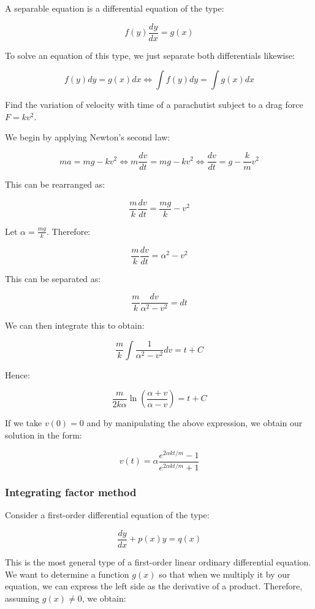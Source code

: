 \documentclass[12pt]{article}
\begin{document}
A separable equation is a differential equation of the type:

\[ f(y)\frac{dy}{dx} = g(x) \]

To solve an equation of this type, we just separate both differentials likewise:

\[ f(y)dy = g(x)dx \Leftrightarrow \int f(y)dy = \int g(x)dx \]

\begin{example}
    Find the variation of velocity with time of a parachutist subject to a drag force $F = kv^2$.

    We begin by applying Newton's second law:

    \[ ma = mg - kv^2 \Leftrightarrow m\frac{dv}{dt} = mg - kv^2 \Leftrightarrow \frac{dv}{dt} = g - \frac{k}{m}v^2\]

    This can be rearranged as:

    \[ \frac{m}{k}\frac{dv}{dt} = \frac{mg}{k} - v^2 \]

    Let $\alpha = \frac{mg}{k}$. Therefore:

    \[ \frac{m}{k}\frac{dv}{dt} = \alpha^2 - v^2 \]

    This can be separated as:

    \[ \frac{m}{k}\frac{dv}{\alpha^2 - v^2} = dt \]

    We can then integrate this to obtain:

    \[ \frac{m}{k}\int\frac{1}{\alpha^2 - v^2}dv = t + C\]

    Hence:

    \[ \frac{m}{2k\alpha}\ln{\left(\frac{\alpha + v}{\alpha - v}\right)} = t + C \]

    If we take $v(0) = 0$ and by manipulating the above expression, we obtain our solution in the form:

    \[ v(t) = \alpha \frac{e^{2\alpha kt/m} - 1}{e^{2\alpha kt/m} + 1} \]
\end{example}

\subsubsection{Integrating factor method}

Consider a first-order differential equation of the type:

\[ \frac{dy}{dx} + p(x)y = q(x) \]

This is the most general type of a first-order linear ordinary differential equation. We want to determine a function $g(x)$ so that when we multiply it by our equation, we can express the left side as the derivative of a product. Therefore, assuming $g(x) \neq 0$, we obtain:
\end{document}

